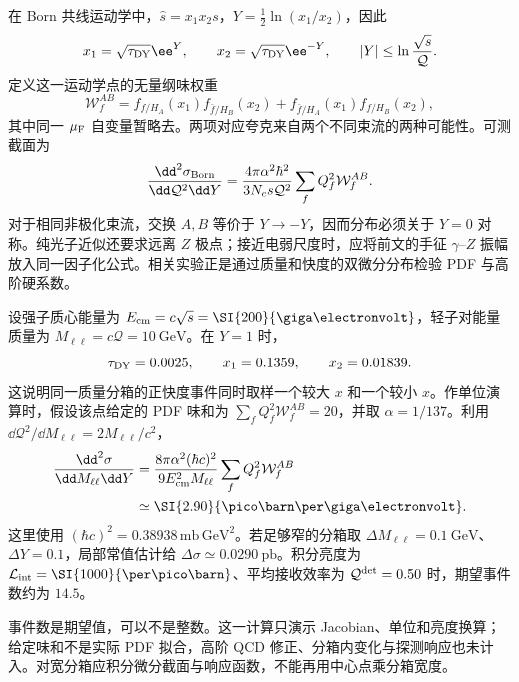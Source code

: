 在 Born 共线运动学中，$\hat s=x_1x_2s$，$Y=\frac12\ln(x_1/x_2)$，因此
\begin{equation}
 x_1=\sqrt{\tau_{\rm DY}}\ee^Y,\qquad
 x_2=\sqrt{\tau_{\rm DY}}\ee^{-Y},\qquad
 |Y|\leq\ln\frac{\sqrt s}{\mathcal Q}.
 \label{eq:dy-born-fractions}
\end{equation}
定义这一运动学点的无量纲味权重
\begin{equation*}
 \mathcal W_f^{AB}
 =f_{f/H_A}(x_1)f_{\bar f/H_B}(x_2)
 +f_{\bar f/H_A}(x_1)f_{f/H_B}(x_2),
\end{equation*}
其中同一 $\mu_{\rm F}$ 自变量暂略去。两项对应夸克来自两个不同束流的两种可能性。可测截面为
\begin{equation}
 \frac{\dd^2\sigma_{\rm Born}}{\dd\mathcal Q^2\dd Y}
 =\frac{4\pi\alpha^2\hbar^2}{3N_c s\mathcal Q^2}
 \sum_f Q_f^2\mathcal W_f^{AB}.
 \label{eq:dy-born-hadronic}
\end{equation}
对于相同非极化束流，交换 $A,B$ 等价于 $Y\to-Y$，因而分布必须关于 $Y=0$ 对称。纯光子近似还要求远离 $Z$ 极点；接近电弱尺度时，应将前文的手征 $\gamma$--$Z$ 振幅放入同一因子化公式。相关实验正是通过质量和快度的双微分分布检验 PDF 与高阶硬系数\cite{CMS2015DrellYan}。

\begin{exbox}
设强子质心能量为 $E_{\rm cm}=c\sqrt s=\SI{200}{\giga\electronvolt}$，轻子对能量质量为 $M_{\ell\ell}=c\mathcal Q=\SI{10}{\giga\electronvolt}$。在 $Y=1$ 时，
\begin{equation*}
 \tau_{\rm DY}=0.0025,\qquad x_1=0.1359,\qquad x_2=0.01839.
\end{equation*}
这说明同一质量分箱的正快度事件同时取样一个较大 $x$ 和一个较小 $x$。作单位演算时，假设该点给定的 PDF 味和为 $\sum_fQ_f^2\mathcal W_f^{AB}=20$，并取 $\alpha=1/137$。利用 $\dd\mathcal Q^2/\dd M_{\ell\ell}=2M_{\ell\ell}/c^2$，
\begin{align*}
 \frac{\dd^2\sigma}{\dd M_{\ell\ell}\dd Y}
 &=\frac{8\pi\alpha^2(\hbar c)^2}{9E_{\rm cm}^2M_{\ell\ell}}
 \sum_fQ_f^2\mathcal W_f^{AB}\\
 &\simeq\SI{2.90}{\pico\barn\per\giga\electronvolt}.
\end{align*}
这里使用 $(\hbar c)^2=0.38938\,\mathrm{mb\,GeV^2}$。若足够窄的分箱取 $\Delta M_{\ell\ell}=\SI{0.1}{\giga\electronvolt}$、$\Delta Y=0.1$，局部常值估计给 $\Delta\sigma\simeq\SI{0.0290}{\pico\barn}$。积分亮度为 $\mathcal L_{\rm int}=\SI{1000}{\per\pico\barn}$、平均接收效率为 $\mathcal Q^{\rm det}=0.50$ 时，期望事件数约为 $14.5$。

事件数是期望值，可以不是整数。这一计算只演示 Jacobian、单位和亮度换算；给定味和不是实际 PDF 拟合，高阶 QCD 修正、分箱内变化与探测响应也未计入。对宽分箱应积分微分截面与响应函数，不能再用中心点乘分箱宽度。
\end{exbox}

